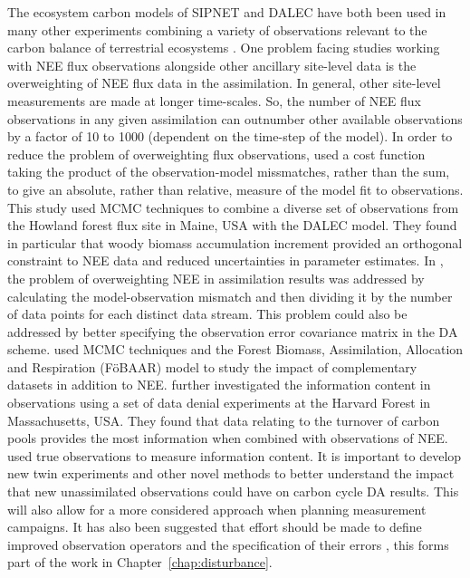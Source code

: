 The ecosystem carbon models of SIPNET and DALEC have both been used in many other experiments combining a variety of observations relevant to the carbon balance of terrestrial ecosystems \citep{Zobitz2008, Moore20081467, Sacks2007, Keenan2011}. One problem facing studies working with NEE flux observations alongside other ancillary site-level data is the overweighting of NEE flux data in the assimilation. In general, other site-level measurements are made at longer time-scales. So, the number of NEE flux observations in any given assimilation can outnumber other available observations by a factor of 10 to 1000 (dependent on the time-step of the model). In order to reduce the problem of overweighting flux observations, \citet{richardson2010estimating} used a cost function taking the product of the observation-model missmatches, rather than the sum, to give an absolute, rather than relative, measure of the model fit to observations. This study used MCMC techniques to combine a diverse set of observations from the Howland forest flux site in Maine, USA with the DALEC model. They found in particular that woody biomass accumulation increment provided an orthogonal constraint to NEE data and reduced uncertainties in parameter estimates. In \citet{Keenan2012}, the problem of overweighting NEE in assimilation results was addressed by calculating the model-observation mismatch and then dividing it by the number of data points for each distinct data stream. This problem could also be addressed by better specifying the observation error covariance matrix in the DA scheme. \citet{Keenan2012} used MCMC techniques and the Forest Biomass, Assimilation, Allocation and Respiration (F\"{o}BAAR) model to study the impact of complementary datasets in addition to NEE. \citet{Keenan2013} further investigated the information content in observations using a set of data denial experiments at the Harvard Forest in Massachusetts, USA. They found that data relating to the turnover of carbon pools provides the most information when combined with observations of NEE. \citet{Keenan2013} used true observations to measure information content. It is important to develop new twin experiments and other novel methods to better understand the impact that new unassimilated observations could have on carbon cycle DA results. This will also allow for a more considered approach when planning measurement campaigns. It has also been suggested that effort should be made to define improved observation operators and the specification of their errors \citep{rayner2010current, williams2009improving}, this forms part of the work in Chapter~\ref{chap:disturbance}.

